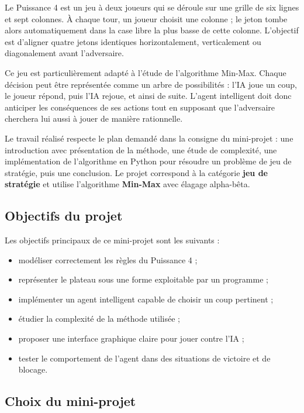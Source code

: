 \documentclass[12pt,a4paper]{article}
\newcommand{\keyword}[1]{\textbf{\textcolor{projectnavy}{#1}}}
\begin{document}
Le Puissance 4 est un jeu à deux joueurs qui se déroule sur une grille de six lignes et sept colonnes. À chaque tour, un joueur choisit une colonne ; le jeton tombe alors automatiquement dans la case libre la plus basse de cette colonne. L'objectif est d'aligner quatre jetons identiques horizontalement, verticalement ou diagonalement avant l'adversaire.

Ce jeu est particulièrement adapté à l'étude de l'algorithme Min-Max. Chaque décision peut être représentée comme un arbre de possibilités : l'IA joue un coup, le joueur répond, puis l'IA rejoue, et ainsi de suite. L'agent intelligent doit donc anticiper les conséquences de ses actions tout en supposant que l'adversaire cherchera lui aussi à jouer de manière rationnelle.

Le travail réalisé respecte le plan demandé dans la consigne du mini-projet : une introduction avec présentation de la méthode, une étude de complexité, une implémentation de l'algorithme en Python pour résoudre un problème de jeu de stratégie, puis une conclusion. Le projet correspond à la catégorie \keyword{jeu de stratégie} et utilise l'algorithme \keyword{Min-Max} avec élagage alpha-bêta.

\subsection{Objectifs du projet}

Les objectifs principaux de ce mini-projet sont les suivants :

\begin{itemize}[leftmargin=1.2cm]
    \item modéliser correctement les règles du Puissance 4 ;
    \item représenter le plateau sous une forme exploitable par un programme ;
    \item implémenter un agent intelligent capable de choisir un coup pertinent ;
    \item étudier la complexité de la méthode utilisée ;
    \item proposer une interface graphique claire pour jouer contre l'IA ;
    \item tester le comportement de l'agent dans des situations de victoire et de blocage.
\end{itemize}

\subsection{Choix du mini-projet}
\end{document}
